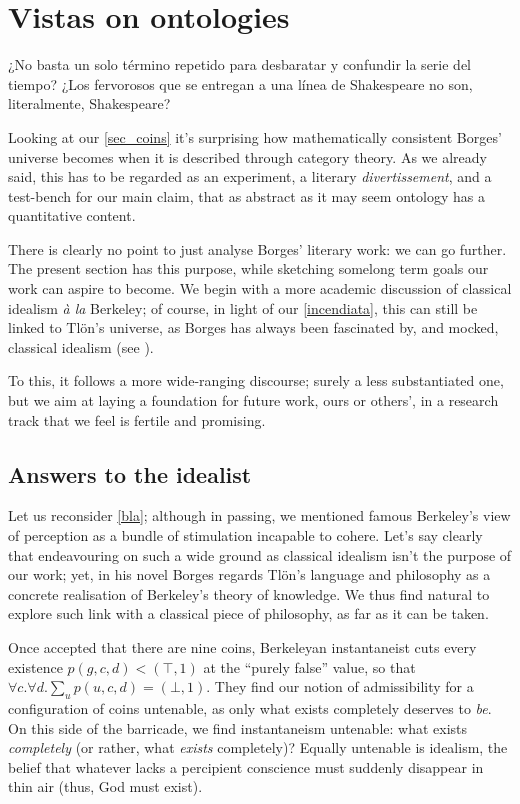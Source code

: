 \section{Vistas on ontologies}\label{vistas}
\epigraph{¿No basta un solo término repetido para desbaratar y confundir la serie del tiempo? ¿Los fervorosos que se entregan a una línea de Shakespeare no son, literalmente, Shakespeare?}{\cite{confutacion}}
Looking at our \autoref{sec_coins} it's surprising how mathematically consistent Borges' universe becomes when it is described through category theory. As we already said, this has to be regarded as an experiment, a literary \emph{divertissement}, and a test-bench for our main claim, that as abstract as it may seem ontology has a quantitative content.

There is clearly no point to just analyse Borges' literary work: we can go further. The present section has this purpose, while sketching somelong term goals our work can aspire to become. We begin with a more academic discussion of classical idealism \emph{à la} Berkeley; of course, in light of our \autoref{incendiata}, this can still be linked to Tl\"on's universe, as Borges has always been fascinated by, and mocked, classical idealism (see \cite{confutacion}).

To this, it follows a more wide-ranging discourse; surely a less substantiated one, but we aim at laying a foundation for future work, ours or others', in a research track that we feel is fertile and promising.
\subsection{Answers to the idealist}\label{berkelei}
Let us reconsider \autoref{bla}; although in passing, we mentioned famous Berkeley's view of perception as a bundle of stimulation incapable to cohere. Let's say clearly that endeavouring on such a wide ground as classical idealism isn't the purpose of our work; yet, in his novel Borges regards Tl\"on's language and philosophy as a concrete realisation of Berkeley's theory of knowledge. We thus find natural to explore such link with a classical piece of philosophy, as far as it can be taken.

Once accepted that there are nine coins, Berkeleyan instantaneist cuts every existence $p(g,c,d) < (\top,1)$ at the ``purely false'' value, so that $\forall c.\forall d.\sum_u p(u,c,d) = (\bot,1)$. They find our notion of admissibility for a configuration of coins untenable, as only what exists completely deserves to \emph{be}. On this side of the barricade, we find instantaneism untenable: what exists \emph{completely} (or rather, what \emph{exists} completely)? Equally untenable is idealism, the belief that whatever lacks a percipient conscience must suddenly disappear in thin air (thus, God must exist).

